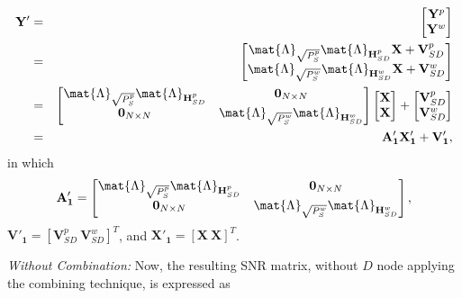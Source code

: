 \begin{eqnarray} \label{Yl_hcm}
	\mathbf{Y'} & = & \begin{bmatrix} \mathbf{Y}^{p} \\ \mathbf{Y}^{w} \end{bmatrix} \nonumber\\
	& = & \begin{bmatrix} \mat{\Lambda}_{\sqrt{P_{S}^{p}}} \mat{\Lambda}_{\mathbf{H}_{SD}^p} \mathbf{X}+ \mathbf{V}_{SD}^{p} \\ \mat{\Lambda}_{\sqrt{P_{S}^{w}}} \mat{\Lambda}_{\mathbf{H}_{SD}^w} \mathbf{X}+ \mathbf{V}_{SD}^{w} \end{bmatrix} \nonumber\\
	& = & \begin{bmatrix} \mat{\Lambda}_{\sqrt{P_{S}^{p}}} \mat{\Lambda}_{\mathbf{H}_{SD}^p} & \mathbf{0}_{N \times N} \\ \mathbf{0}_{N \times N} & \mat{\Lambda}_{\sqrt{P_{S}^{w}}} \mat{\Lambda}_{\mathbf{H}_{SD}^w} \end{bmatrix} \begin{bmatrix} \mathbf{X} \\ \mathbf{X} \end{bmatrix} + \begin{bmatrix} \mathbf{V}_{SD}^{p} \\ \mathbf{V}_{SD}^{w} \end{bmatrix}\nonumber\\
	& = &  \mathbf{A'_1} \mathbf{X'_1} + \mathbf{V'_1},
\end{eqnarray}
in which
\begin{equation}
	\mathbf{A'_1} = \begin{bmatrix} \mat{\Lambda}_{\sqrt{P_{S}^{p}}} \mat{\Lambda}_{\mathbf{H}_{SD}^p} & \mathbf{0}_{N \times N} \\ \mathbf{0}_{N \times N} & \mat{\Lambda}_{\sqrt{P_{S}^{w}}} \mat{\Lambda}_{\mathbf{H}_{SD}^w} \end{bmatrix},
\end{equation}
$ \mathbf{V'_1} = [\mathbf{V}_{SD}^{p} \ \mathbf{V}_{SD}^{w}]^T $, and $ \mathbf{X'_1} = [\mathbf{X} \ \mathbf{X}]^T $.

\textit{Without Combination:} Now, the resulting \ac{SNR} matrix, without $D$ node applying the combining technique, is expressed as

